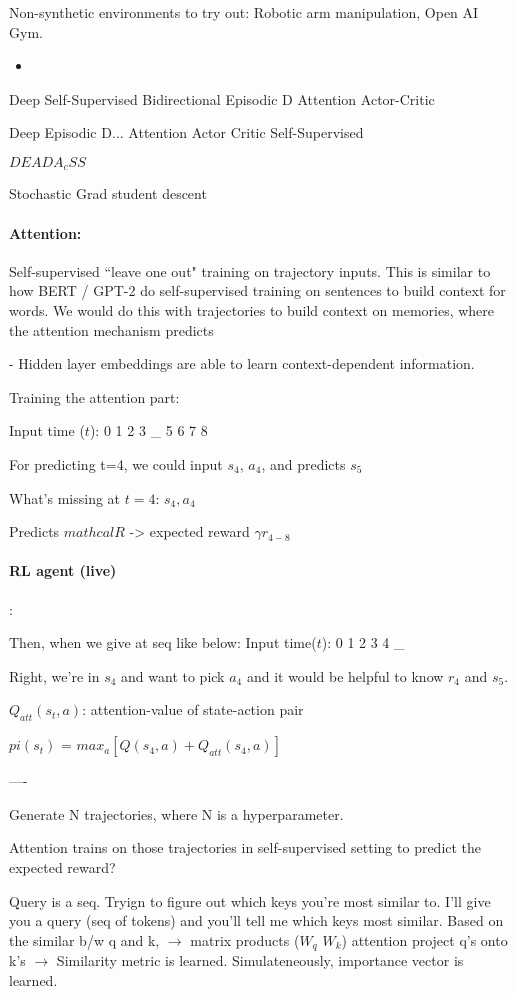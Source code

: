 \documentclass[11pt]{article}
\begin{document}
Non-synthetic environments to try out: Robotic arm manipulation, Open AI Gym. 
\begin{itemize}
  \item 
\end{itemize}


Deep Self-Supervised Bidirectional Episodic D Attention Actor-Critic 

Deep Episodic D$\ldots$ Attention Actor Critic Self-Supervised

$D E A D A_cSS$

Stochastic Grad student descent 

\paragraph{Attention:}

Self-supervised ``leave one out" training on trajectory inputs. This is similar to how BERT / GPT-2 do self-supervised training on sentences to build context for words. We would do this with trajectories to build context on memories, where the attention mechanism predicts 

- Hidden layer embeddings are able to learn context-dependent information.

Training the attention part: 

Input time ($t$): 0 1 2 3 \_ 5 6 7 8       

For predicting t=4, we could input $s_4$, $a_4$, and predicts $s_5$ 

What's missing at $t=4$: $s_4, a_4$

Predicts $mathcal{R}$  -> expected reward $\gamma r_{4-8}$


\paragraph*{RL agent (live)}:

Then, when we give at seq like below:
Input time($t$): 0 1 2 3 4 \_

Right, we're in $s_4$ and want to pick $a_4$ and it would be helpful to know $r_4$ and $s_5$. 

$Q_{att}(s_t, a)$: attention-value of state-action pair

$pi(s_t)$ = $max_a [Q(s_4, a) + Q_{att}(s_4, a)]$ 

----

Generate N trajectories, where N is a hyperparameter. 

Attention trains on those trajectories in self-supervised setting to predict the expected reward?


Query is a seq. Tryign to figure out which keys you're most similar to. I'll give you a query (seq of tokens) and you'll tell me which keys most similar. Based on the similar b/w q and k,  $\to$ matrix products ($W_q$ $W_k$) attention project q's onto k's $\to$ Similarity metric is learned. Simulateneously, importance vector is learned. 
\end{document}
